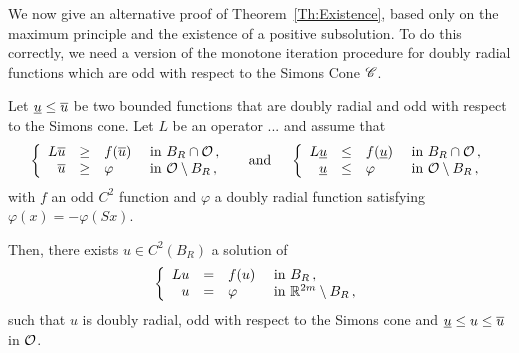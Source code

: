 We now give an alternative proof of Theorem~\ref{Th:Existence}, based only on the maximum principle and the existence of a positive subsolution. To do this correctly, we need a version of the monotone iteration procedure for doubly radial functions which are odd with respect to the Simons Cone $\mathscr{C}$.

\begin{proposition}
	\label{Prop:MonotoneIterationOdd}
	Let $\underline{u} \leq \overline{u}$ be two bounded functions that are doubly radial and odd with respect to the Simons cone. Let $L$ be an operator ...  and assume that
	$$
	\left\{\begin{array}{rcll}
	L\overline{u} & \geq & f(\overline{u}) & \textrm{ in } B_R \cap \mathcal{O}\,, \\
	\overline{u} & \geq & \varphi & \textrm{ in } \mathcal{O} \setminus B_R\,, 
	\end{array} \right.
 \quad \textrm{ and } \quad 
	\left\{\begin{array}{rcll}
	L\underline{u} & \leq & f(\underline{u}) & \textrm{ in } B_R \cap \mathcal{O}\,, \\
	\underline{u} & \leq & \varphi & \textrm{ in } \mathcal{O} \setminus B_R\,, 
	\end{array} \right.
	$$
	with $f$ an odd $C^2$ function and $\varphi$ a doubly radial function satisfying $\varphi (x) = - \varphi(Sx)$.
	
	Then, there exists $u\in C^2(B_R)$ a solution of
	$$
	\left\{\begin{array}{rcll}
	Lu & = & f(u) & \textrm{ in } B_R\,, \\
	u &=& \varphi &  \textrm{ in } \mathbb{R}^{2m} \setminus B_R\,, 
	\end{array} \right.
	$$
	such that $u$ is doubly radial, odd with respect to the Simons cone and  $\underline{u} \leq u \leq \overline{u}$ in $\mathcal{O}$.
\end{proposition}

